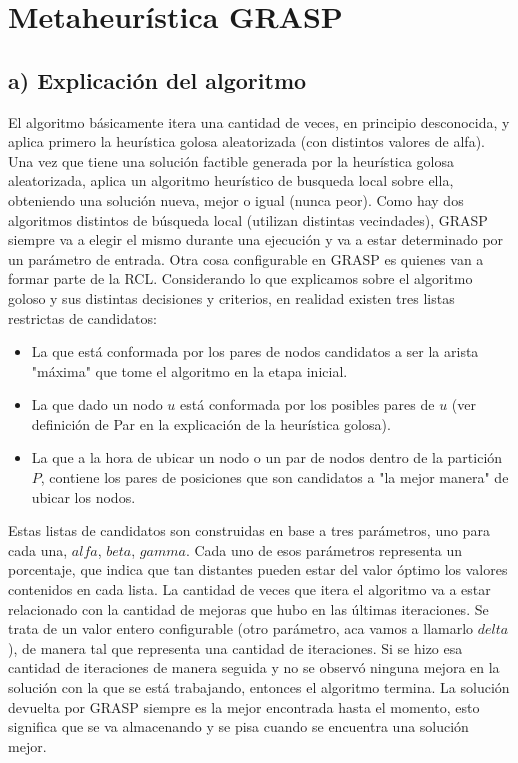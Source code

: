 \documentclass[a4paper]{article}
\begin{document}
\section*{Metaheurística GRASP}
\subsection*{a) Explicación del algoritmo}
El algoritmo básicamente itera una cantidad de veces, en principio desconocida, y aplica primero la heurística golosa aleatorizada (con distintos valores de alfa). Una vez que tiene una solución factible generada por la heurística golosa aleatorizada, aplica un algoritmo heurístico de busqueda local sobre ella, obteniendo una solución nueva, mejor o igual (nunca peor). Como hay dos algoritmos distintos de búsqueda local (utilizan distintas vecindades), GRASP siempre va a elegir el mismo durante una ejecución y va a estar determinado por un parámetro de entrada.
\newline Otra cosa configurable en GRASP es quienes van a formar parte de la RCL. Considerando lo que explicamos sobre el algoritmo goloso y sus distintas decisiones y criterios, en realidad existen tres listas restrictas de candidatos:
\begin{itemize}
\item La que está conformada por los pares de nodos candidatos a ser la arista "máxima" que tome el algoritmo en la etapa inicial.
\item La que dado un nodo $u$ está conformada por los posibles pares de $u$ (ver definición de Par en la explicación de la heurística golosa).
\item La que a la hora de ubicar un nodo o un par de nodos dentro de la partición $P$, contiene los pares de posiciones que son candidatos a "la mejor manera" de ubicar los nodos.
\end{itemize} 

\vspace{0.4cm}
\noindent Estas listas de candidatos son construidas en base a tres parámetros, uno para cada una, $alfa$, $beta$, $gamma$. Cada uno de esos parámetros representa un porcentaje, que indica que tan distantes pueden estar del valor óptimo los valores contenidos en cada lista.
\newline \newline La cantidad de veces que itera el algoritmo va a estar relacionado con la cantidad de mejoras que hubo en las últimas iteraciones. Se trata de un valor entero configurable (otro parámetro, aca vamos a llamarlo $delta$), de manera tal que representa una cantidad de iteraciones. Si se hizo esa cantidad de iteraciones de manera seguida y no se observó ninguna mejora en la solución con la que se está trabajando, entonces el algoritmo termina.
\newline La solución devuelta por GRASP siempre es la mejor encontrada hasta el momento, esto significa que se va almacenando y se pisa cuando se encuentra una solución mejor.
\vspace{0.5cm}
\end{document}
